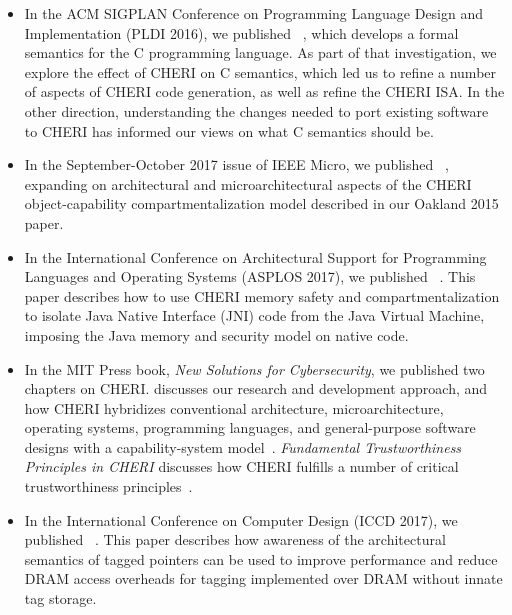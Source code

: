 \begin{itemize}
\item In the ACM SIGPLAN Conference on Programming Language Design and
  Implementation (PLDI 2016), we published
  ~\cite{Cerberus-PLDI16}, which develops a
  formal semantics for the C programming language.
  As part of that investigation, we explore the effect of CHERI on C
  semantics, which led us to refine a number of aspects of CHERI code
  generation, as well as refine the CHERI ISA.  In the other
  direction, understanding the changes needed to port existing
  software to CHERI has informed our views on what C semantics should be.

\item In the September-October 2017 issue of IEEE Micro, we published
  ~\cite{watson2016:microjournal},
  expanding on architectural
  and microarchitectural aspects of the CHERI object-capability
  compartmentalization model described in our Oakland 2015 paper.

\item In the International Conference on Architectural Support for Programming
  Languages and Operating Systems (ASPLOS 2017), we published
  ~\cite{chisnall2017:cherijni}.
  This paper describes how to use CHERI memory safety and compartmentalization
  to isolate Java Native Interface (JNI) code from the Java Virtual Machine,
  imposing the Java memory and security model on native code.

\item In the MIT Press book, \textit{New Solutions for Cybersecurity}, we
  published two chapters on CHERI. 
  discusses our research and development approach, and how
  CHERI hybridizes conventional architecture, microarchitecture, operating
  systems, programming languages, and general-purpose software designs with
  a capability-system model~\cite{watson2017:cheri-deployability}.
  \textit{Fundamental Trustworthiness Principles in CHERI} discusses how CHERI
  fulfills a number of critical trustworthiness
  principles~\cite{neumann2017:cheri-principles}.

\item In the International Conference on Computer Design (ICCD 2017), we
  published ~\cite{joannou2017:tagged-memory}.
  This paper describes how awareness of the architectural semantics of tagged
  pointers can be used to improve performance and reduce DRAM access overheads
  for tagging implemented over DRAM without innate tag storage.


\end{itemize}
